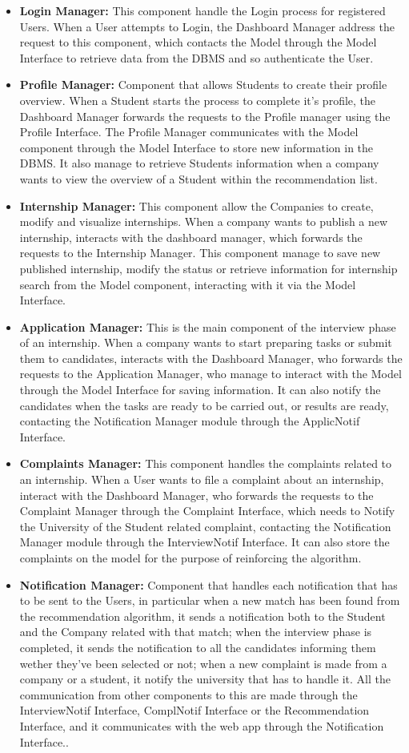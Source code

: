 \begin{itemize}
    \item \textbf{Login Manager:} This component handle the Login process for registered Users. When a User attempts to Login, the Dashboard Manager address the request to this component, which contacts the Model through the Model Interface to retrieve data from the DBMS and so authenticate the User. 
    \item \textbf{Profile Manager:} Component that allows Students to create their profile overview. When a Student starts the process to complete it's profile, the Dashboard Manager forwards the requests to the Profile manager using the Profile Interface. The Profile Manager communicates with the Model component through the Model Interface to store new information in the DBMS. It also manage to retrieve Students information when a company wants to view the overview of a Student within the recommendation list.
    \item \textbf{Internship Manager:} This component allow the Companies to create, modify and visualize internships. When a company wants to publish a new internship, interacts with the dashboard manager, which forwards the requests to the Internship Manager. This component manage to save new published internship, modify the status or retrieve information for internship search from the Model component, interacting with it via the Model Interface.
    \item \textbf{Application Manager:} This is the main component of the interview phase of an internship. When a company wants to start preparing tasks or submit them to candidates, interacts with the Dashboard Manager, who forwards the requests to the Application Manager, who manage to interact with the Model through the Model Interface for saving information. It can also notify the candidates when the tasks are ready to be carried out, or results are ready, contacting the Notification Manager module through the ApplicNotif Interface.
    \item \textbf{Complaints Manager:} This component handles the complaints related to an internship. When a User wants to file a complaint about an internship, interact with the Dashboard Manager, who forwards the requests to the Complaint Manager through the Complaint Interface, which needs to Notify the University of the Student related complaint, contacting the Notification Manager module through the InterviewNotif Interface. It can also store the complaints on the model for the purpose of reinforcing the algorithm.
    \item \textbf{Notification Manager:} Component that handles each notification that has to be sent to the Users, in particular when a new match has been found from the recommendation algorithm, it sends a notification both to the Student and the Company related with that match; when the interview phase is completed, it sends the notification to all the candidates informing them wether they've been selected or not; when a new complaint is made from a company or a student, it notify the university that has to handle it. All the communication from other components to this are made through the InterviewNotif Interface, ComplNotif Interface or the Recommendation Interface, and it communicates with the web app through the Notification Interface..

\end{itemize}
